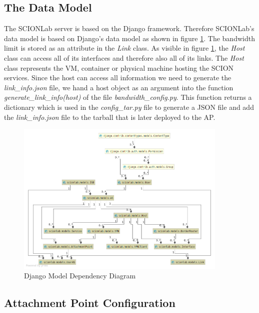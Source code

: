 \newpage
\subsection{The Data Model}

The \acs{SCIONLab} server is based on the Django framework. Therefore \acs{SCIONLab}'s data model is based on Django's data model as shown in figure \ref{Django Model Dependency Diagram}. The bandwidth limit is stored as an attribute in the \textit{Link} class. As visible in figure \ref{Django Model Dependency Diagram}, the \textit{Host} class can access all of its interfaces and therefore also all of its links. The \textit{Host} class represents the \acs{VM}, container or physical machine hosting the \acs{SCION} services. Since the host can access all information we need to generate the \textit{link\_info.json} file, we hand a host object as an argument into the function \textit{generate\_link\_info(host)} of the file \textit{bandwidth\_config.py}. This function returns a dictionary which is used in the \textit{config\_tar.py} file to generate a \acs{JSON} file and add the \textit{link\_info.json} file to the tarball that is later deployed to the \acl{AP}.

\begin{figure}[H]
	\centering
	\includegraphics[width=0.9\textwidth]{img/Django_diagram.png}
	\caption{Django Model Dependency Diagram}
	\label{Django Model Dependency Diagram}
\end{figure}

\subsection{Attachment Point Configuration}

